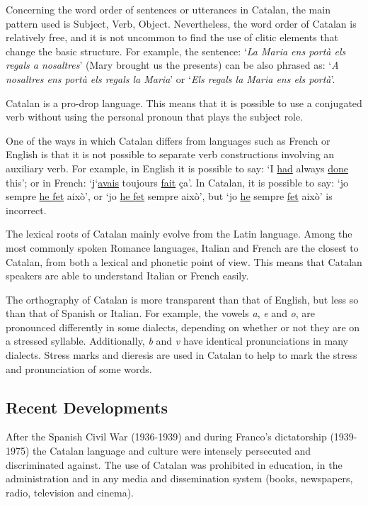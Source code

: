 \begin{multicols}{2}
Concerning the word order of sentences or utterances in Catalan, the main pattern used is Subject, Verb, Object. Nevertheless, the word order of Catalan is relatively free, and it is not uncommon to find the use of clitic elements that change the basic structure. For example, the sentence: ‘\textit{La Maria ens portà els regals a nosaltres}’ (Mary brought us the presents) can be also phrased as: ‘\textit{A nosaltres ens portà els regals la Maria}’ or ‘\textit{Els regals la Maria ens els portà}’.

Catalan is a pro-drop language. This means that it is possible to use a conjugated verb without using the personal pronoun that plays the subject role.

One of the ways in which Catalan differs from languages such as  French or English is that it is not possible to separate verb constructions involving an auxiliary verb. For example, in English it is possible to say: ‘I \underline{had} always \underline{done} this’; or in French: ‘j‘\underline{avais} toujours \underline{fait} ça’. In Catalan, it is possible to say: ‘jo sempre \underline{he fet} això’, or ‘jo \underline{he fet} sempre això’, but ‘jo \underline{he} sempre \underline{fet} això’ is incorrect.

The lexical roots of Catalan mainly evolve from the Latin language. Among the most commonly spoken Romance languages, Italian and French are the closest to Catalan, from both a lexical and phonetic point of view. This means that Catalan speakers are able to understand Italian or French easily.

The orthography of Catalan is more transparent than that of English, but less so than that of Spanish or Italian. For example, the vowels \textit{a}, \textit{e} and \textit{o}, are pronounced differently in some dialects, depending on whether or not they are on a stressed syllable. Additionally, \textit{b} and \textit{v} have identical pronunciations in many dialects. Stress marks and dieresis are used in Catalan to help to mark the stress and pronunciation of some words.

\subsection{Recent Developments}

After the Spanish Civil War (1936-1939) and during Franco’s dictatorship (1939-1975) the Catalan language and culture were intensely persecuted and discriminated against. The use of Catalan was prohibited in education, in the administration and in any media and dissemination system (books, newspapers, radio, television and cinema).


\end{multicols}
